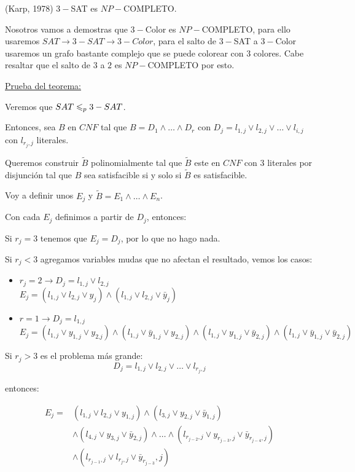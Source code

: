 \documentclass[12pt,a4paper]{article}
\begin{document}
\begin{teorema} (Karp, 1978) $3-$SAT es $NP-$COMPLETO.
\end{teorema}

Nosotros vamos a demostras que $3-$Color es $NP-$COMPLETO, para ello usaremos 
$SAT \to 3-SAT \to 3-Color$, para el salto de $3-$SAT a $3-$Color usaremos 
un grafo bastante complejo que se puede colorear con $3$ colores. Cabe resaltar 
que el salto de $3$ a $2$ es $NP-$COMPLETO por esto.
\medskip

\underline{Prueba del teorema:}
\medskip

Veremos que $SAT \leqslant_{p} 3-SAT$.
\medskip

Entonces, sea $B$ en $CNF$ tal que $B = D_{1} \wedge \ldots \wedge D_{r}$ con 
$D_{j} = l_{1,j} \vee l_{2,j} \vee \ldots \vee l_{i,j}$ con $l_{r_{j},j}$ literales.
\medskip

Queremos construir $\widetilde{B}$ polinomialmente tal que $\widetilde{B}$ este en
$CNF$ con $3$ literales por disjunción tal que $B$ sea satisfacible si y solo si 
$\widetilde{B}$ es satisfacible.
\medskip

Voy a definir unos $E_{j}$ y $\widetilde{B} = E_{1} \wedge \ldots \wedge E_{n}$.
\medskip

Con cada $E_{j}$ definimos a partir de $D_{j}$, entonces:
\medskip

Si $r_{j} = 3$ tenemos que $E_{j} = D_{j}$, por lo que no hago nada.
\medskip

Si $r_{j} < 3$ agregamos variables mudas que no afectan el resultado, vemos los casos:
\begin{itemize}
    \item $r_{j} = 2 \to D_{j}=l_{1,j}\vee l_{2,j}$\\
        $E_{j} = (l_{1,j} \vee l_{2,j} \vee y_{j}) \wedge (l_{1,j} \vee l_{2,j} \vee \bar{y}_{j})$
    \item $r=1 \to D_{j} = l_{1,j}$\\
        $E_{j} = (l_{1,j} \vee y_{1,j} \vee y_{2.j}) \wedge (l_{1,j} \vee \bar{y}_{1,j} \vee y_{2,j}) \wedge 
        (l_{1,j} \vee y_{1,j} \vee \bar{y}_{2,j}) \wedge (l_{1,j} \vee \bar{y}_{1,j} \vee \bar{y}_{2,j})$
\end{itemize}

Si $r_{j} > 3$ es el problema más grande:
$$D_{j} = l_{1,j} \vee l_{2,j} \vee \ldots \vee l_{r_{j},j}$$ 

entonces:

\begin{align*}
    E_{j} = &(l_{1,j} \vee l_{2,j} \vee y_{1,j}) \wedge (l_{3,j} \vee y_{2,j} \vee \bar{y}_{1,j}) \\
    &\wedge (l_{4,j} \vee y_{3,j} \vee \bar{y}_{2,j}) \wedge \ldots \wedge (l_{r_{j-2},j} \vee y_{r_{j-3},j} \vee \bar{y}_{r_{j-4},j})\\
    &\wedge (l_{r_{j-1},j} \vee l_{r_{j},j} \vee \bar{y}_{r_{j-3}},j)
\end{align*}
\end{document}
